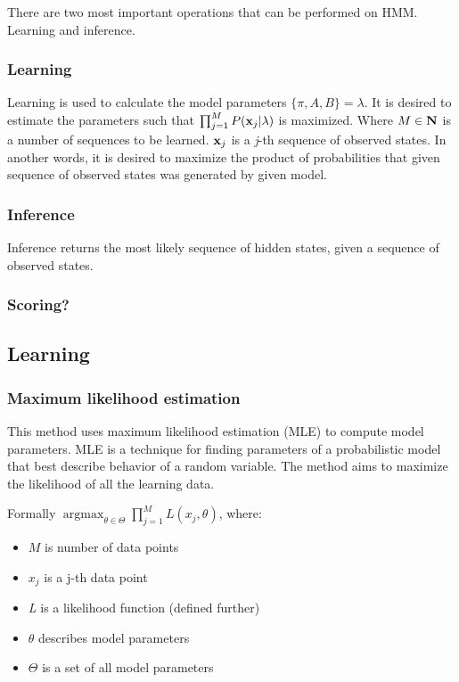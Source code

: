 \documentclass[thesis=B,english]{FITthesis}[2012/06/26]
\DeclareMathOperator*{\argmax}{argmax} %
\begin{document}
There are two most important operations that can be performed on HMM. Learning and inference.

\subsubsection{Learning}

Learning is used to calculate the model parameters $\{\pi, A, B\} = \lambda$. It is desired to estimate the parameters such that $\prod_{j=1}^{M} P(\textbf x_j | \lambda )$ is maximized. Where $M \in \textbf N$ is a number of sequences to be learned. $\textbf x_j$ is a \emph{j}-th sequence of observed states. In another words, it is desired to maximize the product of probabilities that given sequence of observed states was generated by given model.

\subsubsection{Inference}

Inference returns the most likely sequence of hidden states, given a sequence of observed states.

\subsubsection{Scoring?}

\subsection{Learning}

\subsubsection{Maximum likelihood estimation}

This method uses maximum likelihood estimation (MLE) to compute model parameters. MLE is a technique for finding parameters of a probabilistic model that best describe behavior of a random variable. The method aims to maximize the likelihood of all the learning data.

Formally $\argmax_{\theta \in \Theta} \prod_{j=1}^{M} L(x_j, \theta)$, where:

\begin{itemize}

\item $M$ is number of data points
\item $x_j$ is a j-th data point
\item \emph{L} is a likelihood function (defined further)
\item $\theta$ describes model parameters
\item $\Theta$ is a set of all model parameters

\end{itemize}
\end{document}
